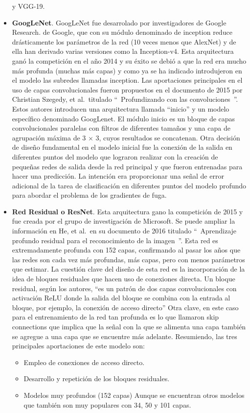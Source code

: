 \documentclass[
  a4paper,
  DIV=11,
  numbers=noendperiod]{scrreprt}
\providecommand{\tightlist}{%
  \setlength{\itemsep}{0pt}\setlength{\parskip}{0pt}}\usepackage{longtable,booktabs,array}
\begin{document}
\begin{itemize}
  y VGG-19.
\item
  \textbf{GoogLeNet}. GoogLeNet fue desarrolado por investigadores de
  Google Research. de Google, que con su módulo denominado de inception
  reduce drásticamente los parámetros de la red (10 veces menos que
  AlexNet) y de ella han derivado varias versiones como la Inception-v4.
  Esta arquitectura ganó la competición en el año 2014 y su éxito se
  debió a que la red era mucho más profunda (muchas más capas) y como ya
  se ha indicado introdujeron en el modelo las subredes llamadas
  inception. Las aportaciones principales en el uso de capas
  convolucionales fueron propuestos en el documento de 2015 por
  Christian Szegedy, et al.~titulado ``~Profundizando con las
  convoluciones~''. Estos autores introducen una arquitectura llamada
  ``inicio'' y un modelo específico denominado GoogLenet. El módulo
  inicio es un bloque de capas convolucionales paralelas con filtros de
  diferentes tamaños y una capa de agrupación máxima de 3 × 3, cuyos
  resultados se concatenan. Otra decisión de diseño fundamental en el
  modelo inicial fue la conexión de la salida en diferentes puntos del
  modelo que lograron realizar con la creación de pequeñas redes de
  salida desde la red principal y que fueron entrenadas para hacer una
  predicción. La intención era proporcionar una señal de error adicional
  de la tarea de clasificación en diferentes puntos del modelo profundo
  para abordar el problema de los gradientes de fuga.
\item
  \textbf{Red Residual o ResNet}. Esta arquitectura gano la competición
  de 2015 y fue creada por el grupo de investigación de Microsoft. Se
  puede ampliar la información en He, et al.~en su documento de 2016
  titulado ``~Aprendizaje profundo residual para el reconocimiento de la
  imagen~''. Esta red es extremadamente profunda con 152 capas,
  confirmando al pasar los años que las redes son cada vez más
  profundas, más capas, pero con menos parámetros que estimar. La
  cuestión clave del diseño de esta red es la incorporación de la idea
  de bloques residuales que hacen uso de conexiones directa. Un bloque
  residual, según los autores, ``es un patrón de dos capas
  convolucionales con activación ReLU donde la salida del bloque se
  combina con la entrada al bloque, por ejemplo, la conexión de acceso
  directo'' Otra clave, en este caso para el entrenamiento de la red tan
  profunda es lo que llamaron skip connections que implica que la señal
  con la que se alimenta una capa también se agregue a una capa que se
  encuentre más adelante. Resumiendo, las tres principales aportaciones
  de este modelo son:

  \begin{itemize}
  \tightlist
  \item
    Empleo de conexiones de acceso directo.
  \item
    Desarrollo y repetición de los bloques residuales.
  \item
    Modelos muy profundos (152 capas) Aunque se encuentran otros modelos
    que también son muy populares con 34, 50 y 101 capas.
  \end{itemize}
\end{itemize}
\end{document}
